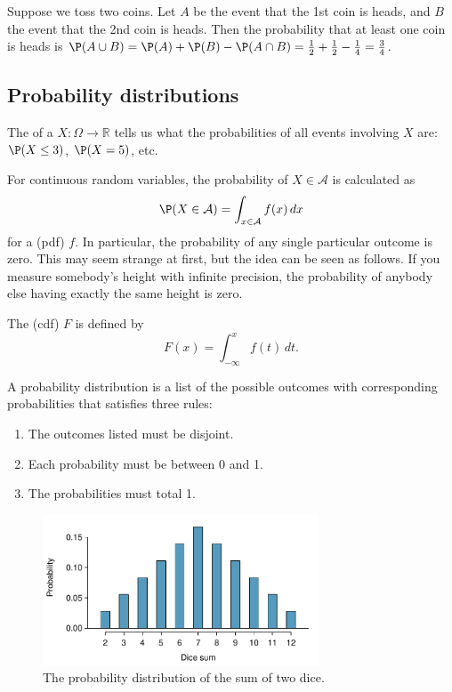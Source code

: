 	\begin{example}%
	Suppose we toss two coins. Let $A$ be the event that the 1st coin is heads, and $B$ the event that the 2nd coin is heads.
	Then the probability that at least one coin is heads is $\P(A\cup B)=\P(A)+\P(B)-\P(A\cap B)=\frac12+\frac12-\frac14 = \frac34$.
	\end{example}

\subsection{Probability distributions}



The  of a  $X:\Omega\to\mathbb R$ tells us what the probabilities of all events involving $X$ are: $\P(X\le 3)$, $\P(X=5)$, etc.

For continuous random variables, the probability of $X\in\mathcal A$ is calculated as
\[
	\P(X\in\mathcal A) = \int_{x\in \mathcal A} f(x)\,dx
\]
for a  (pdf) $f$. In particular, the probability of any single particular outcome is zero. This may seem strange at first, but the idea can be seen as follows. If you measure somebody's height with infinite precision, the probability of anybody else having exactly the same height is zero.

The  (cdf) $F$ is defined by
\[
	F(x)=\int_{-\infty}^x f(t)\,dt.
\]

\begin{termBox}{
A probability distribution is a list of the possible outcomes with corresponding probabilities that satisfies three rules: \vspace{-2mm}
\begin{enumerate}
\setlength{\itemsep}{0mm}
\item The outcomes listed must be disjoint.
\item Each probability must be between 0 and 1.
\item The probabilities must total 1. \vspace{1mm}
\end{enumerate}}
\end{termBox}

\begin{figure}
\centering
\includegraphics[width=0.73\textwidth]{ch_probability/figures/diceSumDist/diceSumDist}
\caption{The probability distribution of the sum of two dice.}
\label{diceSumDist}
\end{figure}

